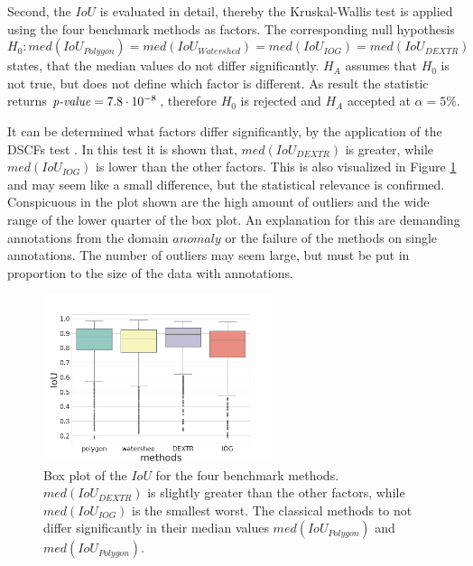 Second, the $ IoU $ is evaluated in detail, thereby the Kruskal-Wallis test is applied using the four benchmark methods as factors.
The corresponding null hypothesis 
\begin{equation}
	H_{0}: med \left( IoU_{Polygon} \right) = med \left( IoU_{Watershed} \right) = med \left( IoU_{IOG} \right) = med \left( IoU_{DEXTR} \right)
\end{equation}
states, that the median values do not differ significantly.
$ H_{A} $ assumes that $ H_{0} $ is not true, but does not define which factor is different.
As result the statistic returns $ \textnormal{\textit{p-value}} = 7.8 \cdot 10 ^{-8} $, therefore $ H_{0} $ is rejected and $ H_{A} $ accepted at $ \alpha=5\% $.

It can be determined what factors differ significantly, by the application of the DSCFs  test \cite{CF91-dscf}.
In this test it is shown that, $ med \left( IoU_{DEXTR} \right) $ is greater, while $ med \left( IoU_{IOG} \right) $ is lower than the other factors. 
This is also visualized in Figure \ref{fig:ch5:sec1:iou_box_plot} and may seem like a small difference, but the statistical relevance is confirmed.
Conspicuous in the plot shown are the high amount of outliers and the wide range of the lower quarter of the box plot.
An explanation for this are demanding annotations from the domain $ anomaly $ or the failure of the methods on single annotations.
The number of outliers may seem large, but must be put in proportion to the size of the data with \getNumberBenchmarkAnnotations annotations.

\begin{figure}
	\centering
	\includegraphics[width=0.6\textwidth]{figures/chap51_iou_boxplot.png}
	\caption[Box plots method on $ IoU $]{
		Box plot of the $ IoU $ for the four benchmark methods.
		$ med \left( IoU_{DEXTR} \right) $ is slightly greater than the other factors, while $ med \left( IoU_{IOG} \right) $ is the smallest worst.
		The classical methods to not differ significantly in their median values $ med \left( IoU_{Polygon} \right) $ and $ med \left( IoU_{Polygon} \right) $.
	} \label{fig:ch5:sec1:iou_box_plot}
\end{figure}



